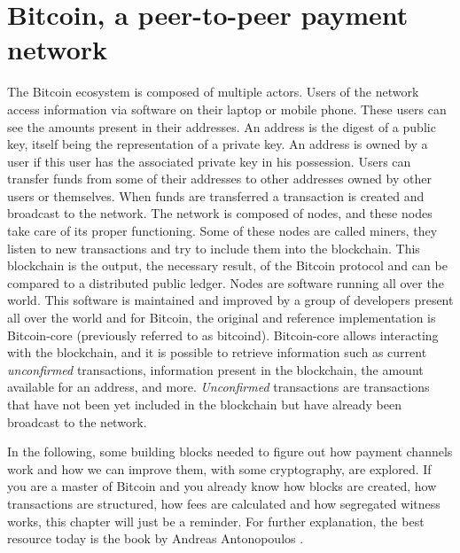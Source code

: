 \chapter{Bitcoin, a peer-to-peer payment network}
\label{chap:bitcoin}

The Bitcoin ecosystem is composed of multiple actors. Users of the network
access information via software on their laptop or mobile phone. These users can
see the amounts present in their addresses. An address is the digest of a public
key, itself being the representation of a private key. An address is owned by a
user if this user has the associated private key in his possession. Users can
transfer funds from some of their addresses to other addresses owned by other
users or themselves. When funds are transferred a transaction is created and
broadcast to the network. The network is composed of nodes, and these nodes take care
of its proper functioning. Some of these nodes are called miners, they listen to
new transactions and try to include them into the blockchain. This blockchain is
the output, the necessary result, of the Bitcoin protocol and can be compared to
a distributed public ledger. Nodes are software running all over the world. This
software is maintained and improved by a group of developers present all over
the world and for Bitcoin, the original and reference implementation is
Bitcoin-core (previously referred to as bitcoind). Bitcoin-core allows interacting with the blockchain, and it is
possible to retrieve information such as current \textit{unconfirmed} transactions,
information present in the blockchain, the amount available for an address, and
more. \textit{Unconfirmed} transactions are transactions that have not been yet included
in the blockchain but have already been broadcast to the network.

In the following, some building blocks needed to figure out how payment channels
work and how we can improve them, with some cryptography, are explored. If you
are a master of Bitcoin and you already know how blocks are created, how
transactions are structured, how fees are calculated and how segregated witness
works, this chapter will just be a reminder. For further explanation, the best
resource today is the book  by Andreas Antonopoulos
\cite{Antonopoulos:2014:MBU:2695500}.


\minitoc

